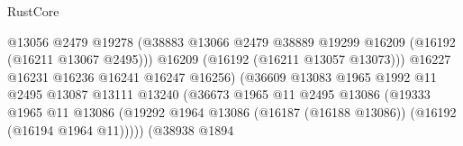\begin{lexlean}{RustCore}
\begin{coremodule}
                                                    @13056
                                                    @2479
                                                    @19278
                                                    (@38883
                                                      @13066
                                                      @2479
                                                      @38889
                                                      @19299
                                                      @16209
                                                      (@16192 (@16211 @13067 @2495)))
                                                    @16209
                                                    (@16192 (@16211 @13057 @13073)))
                                                  @16227
                                                  @16231
                                                  @16236
                                                  @16241
                                                  @16247
                                                  @16256)
                                                (@36609
                                                  @13083
                                                  @1965
                                                  @1992
                                                  @11
                                                  @2495
                                                  @13087
                                                  @13111
                                                  @13240
                                                  (@36673
                                                    @1965
                                                    @11
                                                    @2495
                                                    @13086
                                                    (@19333
                                                      @1965
                                                      @11
                                                      @13086
                                                      (@19292
                                                        @1964
                                                        @13086
                                                        (@16187 (@16188 @13086))
                                                        (@16192 (@16194 @1964 @11)))))
                                                  (@38938
                                                    @1894

\end{coremodule}
\end{lexlean}

